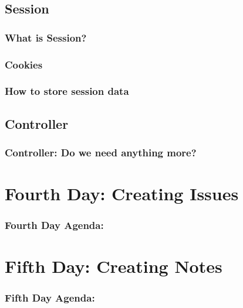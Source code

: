 \documentclass{beamer}
\theoremstyle{mystyle}
\begin{document}
  \subsection{Session}
    \begin{frame}
      \frametitle{What is Session?}
    \end{frame}
    \subsubsection{Cookies}
      \begin{frame}
        \frametitle{How to store session data}
      \end{frame}
      \subsection{Controller}
      \begin{frame}
        \frametitle{Controller: Do we need anything more?}
      \end{frame}
 

\section{Fourth Day: Creating Issues}
    \begin{frame}
      \frametitle{Fourth Day Agenda:}
      \tableofcontents
      [
      currentsection,
      sectionstyle=hide/hide,
      subsectionstyle=show/show/hide
      ]
    \end{frame}

\section{Fifth Day: Creating Notes}
    \begin{frame}
      \frametitle{Fifth Day Agenda:}
      \tableofcontents
      [
      currentsection,
      sectionstyle=hide/hide,
      subsectionstyle=show/show/hide
      ]
    \end{frame}
  
\end{document}
